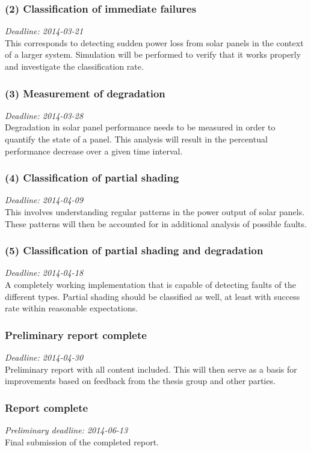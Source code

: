 \documentclass[a4paper,11pt]{article}
\begin{document}
\subsubsection*{(2) Classification of immediate failures}
\noindent
\emph{Deadline: 2014-03-21}\\
\noindent
This corresponds to detecting sudden power loss from solar panels in the context of a larger system.
Simulation will be performed to verify that it works properly and investigate the classification rate.

\subsubsection*{(3) Measurement of degradation}
\noindent
\emph{Deadline: 2014-03-28}\\
\noindent
Degradation in solar panel performance needs to be measured in order to quantify the state of a panel.
This analysis will result in the percentual performance decrease over a given time interval.

\subsubsection*{(4) Classification of partial shading}
\noindent
\emph{Deadline: 2014-04-09}\\
\noindent
This involves understanding regular patterns in the power output of solar panels.
These patterns will then be accounted for in additional analysis of possible faults.

\subsubsection*{(5) Classification of partial shading and degradation}
\noindent
\emph{Deadline: 2014-04-18}\\
\noindent
A completely working implementation that is capable of detecting faults of the different types.
Partial shading should be classified as well, at least with success rate within reasonable expectations.

\subsubsection*{Preliminary report complete}
\noindent
\emph{Deadline: 2014-04-30}\\
\noindent
Preliminary report with all content included.
This will then serve as a basis for improvements based on feedback from the thesis group and other parties.

\subsubsection*{Report complete}
\noindent
\emph{Preliminary deadline: 2014-06-13}\\
\noindent
Final submission of the completed report.
\end{document}
